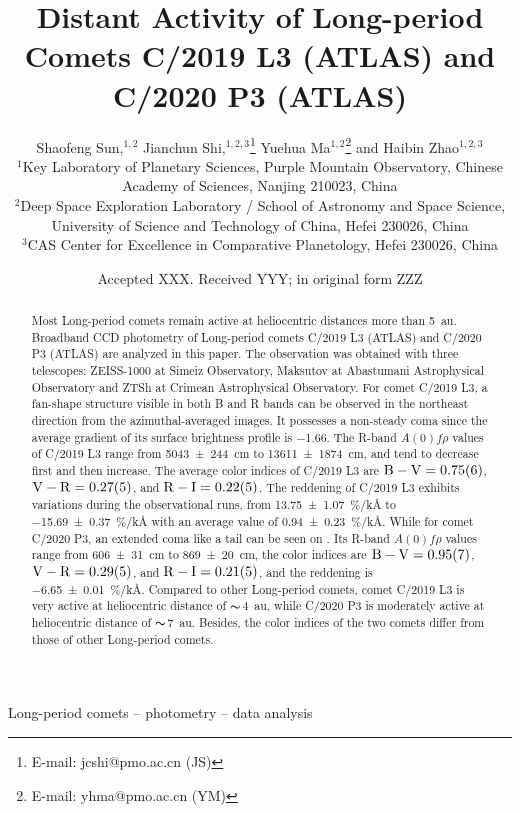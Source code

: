 \documentclass[fleqn,usenatbib]{mnras}
\title[Distant Activity of C/2019 L3 and C/2020 P3]{Distant Activity of Long-period Comets C/2019 L3 (ATLAS) and C/2020 P3 (ATLAS)}
\author[Shaofeng Sun et al.]{
Shaofeng Sun,$^{1,2}$
Jianchun Shi,$^{1,2,3}$\thanks{E-mail: jcshi@pmo.ac.cn (JS)}
Yuehua Ma$^{1,2}$\thanks{E-mail: yhma@pmo.ac.cn (YM)}
and Haibin Zhao$^{1,2,3}$
\\
$^{1}$Key Laboratory of Planetary Sciences, Purple Mountain Observatory, Chinese Academy of Sciences, Nanjing 210023, China\\
$^{2}$Deep Space Exploration Laboratory / School of Astronomy and Space Science, University of Science and Technology of China, Hefei 230026, China\\
$^{3}$CAS Center for Excellence in Comparative Planetology, Hefei 230026, China
}
\date{Accepted XXX. Received YYY; in original form ZZZ}
\begin{document}
\label{firstpage}
\pagerange{\pageref{firstpage}--\pageref{lastpage}}
\maketitle


\begin{abstract}
	Most Long-period comets remain active at heliocentric distances more than {\SI{5}{\astronomicalunit}}. Broadband CCD photometry of Long-period comets C/2019 L3 (ATLAS) and C/2020 P3 (ATLAS) are analyzed in this paper.
	The observation was obtained with three telescopes: ZEISS-1000 at Simeiz Observatory, Maksutov at Abastumani Astrophysical Observatory and ZTSh at Crimean Astrophysical Observatory. For comet C/2019 L3, a fan-shape structure visible in both B and R bands can be observed in the northeast direction from the azimuthal-averaged images. It possesses a non-steady coma since the average gradient of its surface brightness profile is \num{-1.66}. The R-band $A(0)f\rho$ values of C/2019 L3 range from {\SI{5043 +- 244}{\cm}} to {\SI{13611 +- 1874}{\cm}}, and tend to decrease first and then increase. The average color indices of C/2019 L3 are $\mathrm{B-V} = \num{0.75 +- 0.06}$, $\mathrm{V-R} = \num{0.27 +- 0.05}$, and $\mathrm{R-I} = \num{0.22 +- 0.05}$. The reddening of C/2019 L3 exhibits variations during the observational runs, from {\SI{13.75 +- 1.07}{\percent/\kilo\angstrom}} to {\SI{-15.69 +- 0.37}{\percent/\kilo\angstrom}} with an average value of {\SI{0.94 +- 0.23}{\percent/\kilo\angstrom}}. While for comet C/2020 P3, an extended coma like a tail can be seen on . Its R-band $A(0)f\rho$ values range from {\SI{606 +- 31}{\cm}} to {\SI{869 +- 20}{\cm}}, the color indices are $\mathrm{B-V} = \num{0.95 +- 0.07}$, $\mathrm{V-R} = \num{0.29 +- 0.05}$, and $\mathrm{R-I} = \num{0.21 +- 0.05}$, and the reddening is {\SI{-6.65 +- 0.01}{\percent/\kilo\angstrom}}. Compared to other Long-period comets, comet C/2019 L3 is very active at heliocentric distance of $\thicksim${\qty{4}{\astronomicalunit}}, while C/2020 P3 is moderately active at heliocentric distance of $\thicksim${\qty{7}{\astronomicalunit}}. Besides, the color indices of the two comets differ from those of other Long-period comets. 
\end{abstract}

\begin{keywords}
Long-period comets -- photometry -- data analysis
\end{keywords}
\end{document}
